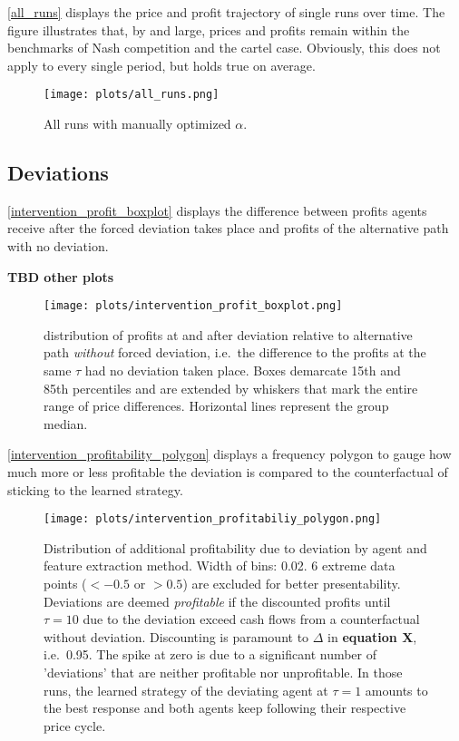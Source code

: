  \autoref{all_runs} displays the price and profit trajectory of single runs over time. The figure illustrates that, by and large, prices and profits remain within the benchmarks of Nash competition and the cartel case. Obviously, this does not apply to every single period, but holds true on average.
 
\begin{figure}
	\texttt{[image: plots/all\_runs.png]}
	\caption{All runs with manually optimized $\alpha$.}
	\label{all_runs}
\end{figure}

\pagebreak
\subsection{Deviations}\label{deviations_appendix}

\autoref{intervention_profit_boxplot} displays the difference between profits agents receive after the forced deviation takes place and profits of the alternative path with no deviation.

\textbf{TBD other plots}

\begin{figure}
	\texttt{[image: plots/intervention\_profit\_boxplot.png]}
	\caption{distribution of profits at and after deviation relative to alternative path \emph{without} forced deviation, i.e.\ the difference to the profits at the same $\tau$ had no deviation taken place. Boxes demarcate 15th and 85th percentiles and are extended by whiskers that mark the entire range of price differences. Horizontal lines represent the group median.}
	\label{intervention_profit_boxplot}
\end{figure}

\autoref{intervention_profitability_polygon} displays a frequency polygon to gauge how much more or less profitable the deviation is compared to the counterfactual of sticking to the learned strategy.

\begin{figure}
	\texttt{[image: plots/intervention\_profitabiliy\_polygon.png]}
	\caption{Distribution of additional profitability due to deviation by agent and feature extraction method. Width of bins: 0.02. 6 extreme data points ($<-0.5$ or $>0.5$) are excluded for better presentability. Deviations are deemed \emph{profitable} if the discounted profits until $\tau = 10$ due to the deviation exceed cash flows from a counterfactual without deviation. Discounting is paramount to $\Delta$ in \textbf{equation X}, i.e.\ 0.95. The spike at zero is due to a significant number of 'deviations' that are neither profitable nor unprofitable. In those runs, the learned strategy of the deviating agent at $\tau = 1$ amounts to the best response and both agents keep following their respective price cycle.}
	\label{intervention_profitability_polygon}
\end{figure}



